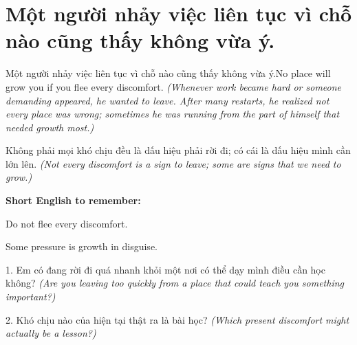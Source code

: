 \section{Một người nhảy việc liên tục vì chỗ nào cũng thấy không vừa ý.}
\begin{truyen}{Một người nhảy việc liên tục vì chỗ nào cũng thấy không vừa ý.}{No place will grow you if you flee every discomfort.}
\textit{(Whenever work became hard or someone demanding appeared, he wanted to leave. After many restarts, he realized not every place was wrong; sometimes he was running from the part of himself that needed growth most.)}
\end{truyen}
\begin{baihoc}
Không phải mọi khó chịu đều là dấu hiệu phải rời đi; có cái là dấu hiệu mình cần lớn lên.
\textit{(Not every discomfort is a sign to leave; some are signs that we need to grow.)}
\end{baihoc}
\begin{ghinhoanh}
\textbf{Short English to remember:}

Do not flee every discomfort.

Some pressure is growth in disguise.
\end{ghinhoanh}
\begin{tuhocnhanh}
1. Em có đang rời đi quá nhanh khỏi một nơi có thể dạy mình điều cần học không? \textit{(Are you leaving too quickly from a place that could teach you something important?)}

2. Khó chịu nào của hiện tại thật ra là bài học? \textit{(Which present discomfort might actually be a lesson?)}
\end{tuhocnhanh}
\ngancach

